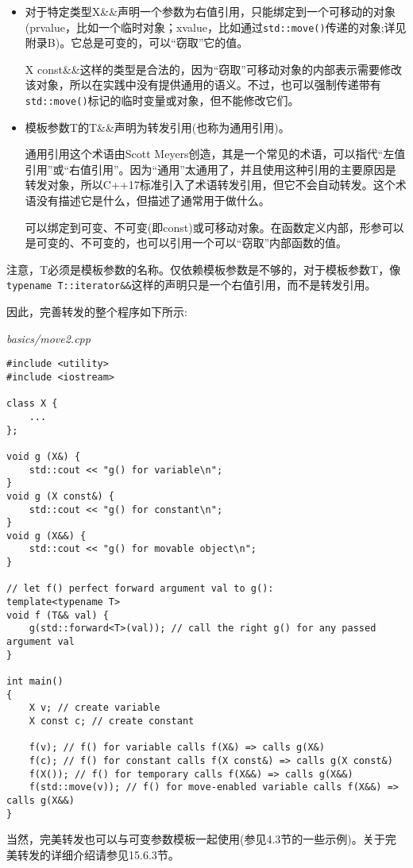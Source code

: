 \begin{itemize}
\item 
对于特定类型X\&\&声明一个参数为右值引用，只能绑定到一个可移动的对象(prvalue，比如一个临时对象；xvalue，比如通过\texttt{std::move()}传递的对象;详见附录B)。它总是可变的，可以“窃取”它的值。

\begin{tcolorbox}[colback=webgreen!5!white,colframe=webgreen!75!black]
\hspace*{0.75cm}X const\&\&这样的类型是合法的，因为“窃取”可移动对象的内部表示需要修改该对象，所以在实践中没有提供通用的语义。不过，也可以强制传递带有\texttt{std::move()}标记的临时变量或对象，但不能修改它们。
\end{tcolorbox}

\item 
模板参数T的T\&\&声明为转发引用(也称为通用引用)。

\begin{tcolorbox}[colback=webgreen!5!white,colframe=webgreen!75!black]
\hspace*{0.75cm}通用引用这个术语由Scott Meyers创造，其是一个常见的术语，可以指代“左值引用”或“右值引用”。因为“通用”太通用了，并且使用这种引用的主要原因是转发对象，所以C++17标准引入了术语转发引用，但它不会自动转发。这个术语没有描述它是什么，但描述了通常用于做什么。
\end{tcolorbox}

可以绑定到可变、不可变(即const)或可移动对象。在函数定义内部，形参可以是可变的、不可变的，也可以引用一个可以“窃取”内部函数的值。
\end{itemize}

注意，T必须是模板参数的名称。仅依赖模板参数是不够的，对于模板参数T，像\texttt{typename T::iterator\&\&}这样的声明只是一个右值引用，而不是转发引用。

因此，完善转发的整个程序如下所示:

\noindent
\textit{basics/move2.cpp}
\begin{lstlisting}[style=styleCXX]
#include <utility>
#include <iostream>

class X {
	...
};

void g (X&) {
	std::cout << "g() for variable\n";
}
void g (X const&) {
	std::cout << "g() for constant\n";
}
void g (X&&) {
	std::cout << "g() for movable object\n";
}

// let f() perfect forward argument val to g():
template<typename T>
void f (T&& val) {
	g(std::forward<T>(val)); // call the right g() for any passed argument val
}

int main()
{
	X v; // create variable
	X const c; // create constant
	
	f(v); // f() for variable calls f(X&) => calls g(X&)
	f(c); // f() for constant calls f(X const&) => calls g(X const&)
	f(X()); // f() for temporary calls f(X&&) => calls g(X&&)
	f(std::move(v)); // f() for move-enabled variable calls f(X&&) => calls g(X&&)
}
\end{lstlisting}

当然，完美转发也可以与可变参数模板一起使用(参见4.3节的一些示例)。关于完美转发的详细介绍请参见15.6.3节。





